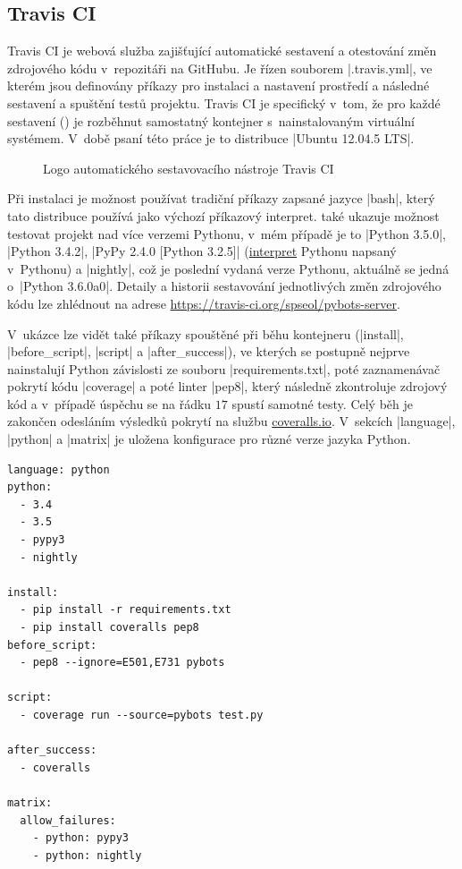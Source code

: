 \subsection{Travis CI}
\label{subsec:travis-ci}

Travis CI je webová služba zajišťující automatické sestavení a otestování změn zdrojového kódu v~repozitáři na GitHubu. Je řízen souborem \ic|.travis.yml|\cite{travis-docs}, ve kterém jsou definovány příkazy pro instalaci a nastavení prostředí a následné sestavení a spuštění testů projektu. Travis CI je specifický v~tom, že pro každé sestavení () je rozběhnut samostatný kontejner s~nainstalovaným virtuální systémem. V~době psaní této práce je to distribuce \ic|Ubuntu 12.04.5 LTS|. 

\begin{figure}
	\centering
	
	\caption{Logo automatického sestavovacího nástroje Travis CI}
\end{figure}

Při instalaci je možnost používat tradiční příkazy zapsané jazyce \ic|bash|, který tato distribuce používá jako výchozí příkazový interpret.  také ukazuje možnost testovat projekt nad více verzemi Pythonu, v~mém případě je to \ic|Python 3.5.0|, \ic|Python 3.4.2|, \ic|PyPy 2.4.0 [Python 3.2.5]| (\href{http://pypy.org/}{interpret} Pythonu napsaný v~Pythonu) a \ic|nightly|, což je poslední vydaná verze Pythonu, aktuálně se jedná o~\ic|Python 3.6.0a0|. Detaily a historii sestavování jednotlivých změn zdrojového kódu lze zhlédnout na adrese \url{https://travis-ci.org/spseol/pybots-server}.

V~ukázce lze vidět také příkazy spouštěné při běhu kontejneru (\ic|install|, \ic|before_script|, \ic|script| a \ic|after_success|), ve kterých se postupně nejprve nainstalují Python závislosti ze souboru \ic|requirements.txt|, poté zaznamenávač pokrytí kódu \ic|coverage| a poté linter \ic|pep8|, který následně zkontroluje zdrojový kód a v~případě úspěchu se na řádku $17$ spustí samotné testy. Celý běh je zakončen odesláním výsledků pokrytí na službu \href{https://coveralls.io/}{coveralls.io}. V~sekcích \ic|language|, \ic|python| a \ic|matrix| je uložena konfigurace pro různé verze jazyka Python.

\begin{lstlisting}[caption={Zkrácená ukázka konfiguračního soubotu .travis.yml},label={lst:travis-yml},keywords={}]
language: python
python:
  - 3.4
  - 3.5
  - pypy3
  - nightly

install:
  - pip install -r requirements.txt
  - pip install coveralls pep8
before_script:
  - pep8 --ignore=E501,E731 pybots

script:
  - coverage run --source=pybots test.py

after_success:
  - coveralls

matrix:
  allow_failures:
    - python: pypy3
    - python: nightly
\end{lstlisting}

